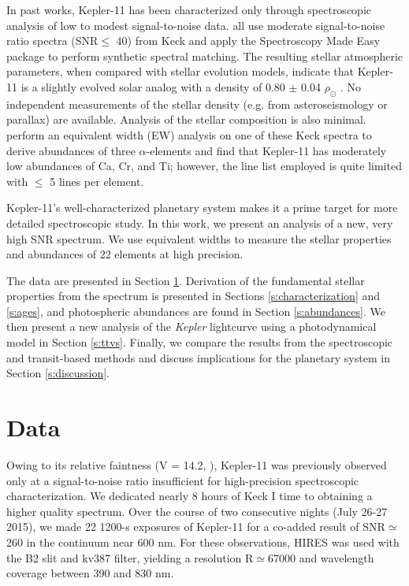 \documentclass[oneside]{emulateapj}
\begin{document}
In past works, Kepler-11 has been characterized only through spectroscopic analysis of low to modest signal-to-noise data. \citet{Lissauer2011, Lissauer2013, Rowe2014} all use moderate signal-to-noise ratio spectra (SNR$\leq$ 40) from Keck and apply the Spectroscopy Made Easy package \citep[SME,][]{Valenti1996} to perform synthetic spectral matching. The resulting stellar atmospheric parameters, when compared with stellar evolution models, indicate that Kepler-11 is a slightly evolved solar analog with a density of 0.80 $\pm$ 0.04 $\rho_{\odot}$ \citep{Lissauer2013}. No independent measurements of the stellar density (e.g. from asteroseismology or parallax) are available. Analysis of the stellar composition is also minimal. \citet{Adibekyan2012b} perform an equivalent width (EW) analysis on one of these Keck spectra to derive abundances of three $\alpha$-elements and find that Kepler-11 has moderately low abundances of Ca, Cr, and Ti; however, the line list employed is quite limited with $\leq$ 5 lines per element.

Kepler-11's well-characterized planetary system makes it a prime target for more detailed spectroscopic study. In this work, we present an analysis of a new, very high SNR spectrum. We use equivalent widths to measure the stellar properties and abundances of 22 elements at high precision.

The data are presented in Section \ref{s:data}. Derivation of the fundamental stellar properties from the spectrum is presented in Sections \ref{s:characterization} and \ref{s:ages}, and photospheric abundances are found in Section \ref{s:abundances}. We then present a new analysis of the \textit{Kepler} lightcurve using a photodynamical model in Section \ref{s:ttvs}. Finally, we compare the results from the spectroscopic and transit-based methods and discuss implications for the planetary system in Section \ref{s:discussion}.


\section{Data}
\label{s:data}

Owing to its relative faintness (V = 14.2, \citet{Lissauer2011}), Kepler-11 was previously observed only at a signal-to-noise ratio insufficient for high-precision spectroscopic characterization. We dedicated nearly 8 hours of Keck I time to obtaining a higher quality spectrum. Over the course of two consecutive nights (July 26-27 2015), we made 22 1200-s exposures of Kepler-11 for a co-added result of SNR$\simeq$260 in the continuum near 600 nm. For these observations, HIRES was used with the B2 slit and kv387 filter, yielding a resolution R$\simeq$67000 and wavelength coverage between 390 and 830 nm.
\end{document}
